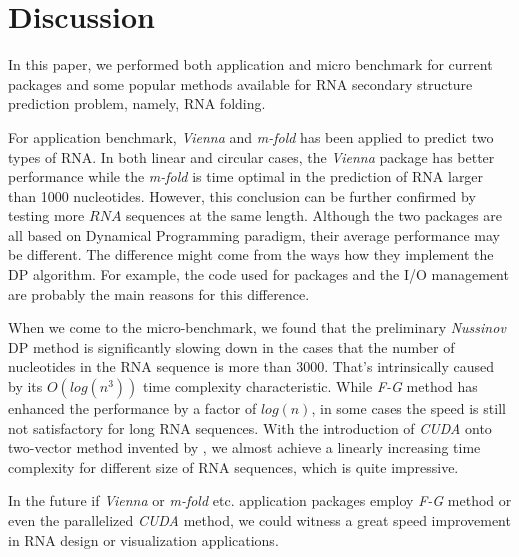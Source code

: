 \documentclass[12pt]{article}
\begin{document}
\section{Discussion}
In this paper, we performed both application and micro benchmark for current packages and some popular methods available for RNA secondary structure prediction problem, namely, RNA folding.

For application benchmark, \textit{Vienna} and \textit{m-fold} has been applied to predict two types of RNA. In both linear and circular cases, the \textit{Vienna} package has better performance while the \textit{m-fold} is time optimal in the prediction of RNA larger than 1000 nucleotides. However, this conclusion can be further confirmed by testing more $RNA$ sequences at the same length. Although the two packages are all based on Dynamical Programming paradigm, their average performance may be different. The difference might come from the ways how they implement the DP algorithm. For example, the code used for packages and the I/O management are probably the main reasons for this difference.

When we come to the micro-benchmark, we found that the preliminary \textit{Nussinov} DP method is significantly slowing down in the cases that the number of nucleotides in the RNA sequence is more than 3000. That's intrinsically caused by its $O(log(n^3))$ time complexity characteristic. While \textit{F-G} method \cite{gusfield} has enhanced the performance by a factor of $log(n)$, in some cases the speed is still not satisfactory for long RNA sequences. With the introduction of \textit{CUDA} onto two-vector method invented by \cite{balaji}, we almost achieve a linearly increasing time complexity for different size of RNA sequences, which is quite impressive.

In the future if \textit{Vienna} or \textit{m-fold} etc. application packages employ \textit{F-G} method or even the parallelized \textit{CUDA} method, we could witness a great speed improvement in RNA design or visualization applications.
\end{document}

